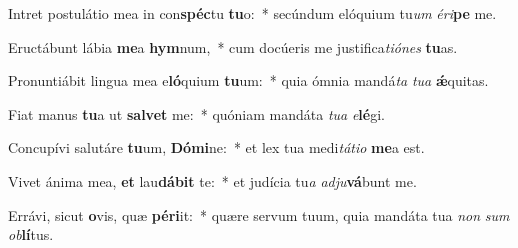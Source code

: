 \item Intret postulátio mea in con\textbf{spéc}tu \textbf{tu}o:~* secúndum elóquium tu\textit{um} \textit{é}\textit{ri}\textbf{pe} me.
\item Eructábunt lábia \textbf{me}a \textbf{hym}num,~* cum docúeris me justifica\textit{ti}\textit{ó}\textit{nes} \textbf{tu}as.
\item Pronuntiábit lingua mea e\textbf{ló}quium \textbf{tu}um:~* quia ómnia mandá\textit{ta} \textit{tu}\textit{a} \textbf{ǽ}quitas.
\item Fiat manus \textbf{tu}a ut \textbf{sal}\textbf{vet} me:~* quóniam mandáta \textit{tu}\textit{a} \textit{e}\textbf{lé}gi.
\item Concupívi salutáre \textbf{tu}um, \textbf{Dó}\textbf{mi}ne:~* et lex tua medi\textit{tá}\textit{ti}\textit{o} \textbf{me}a est.
\item Vivet ánima mea, \textbf{et} lau\textbf{dá}\textbf{bit} te:~* et judícia tu\textit{a} \textit{ad}\textit{ju}\textbf{vá}bunt me.
\item Errávi, sicut \textbf{o}vis, quæ \textbf{pér}\textbf{i}it:~* quære servum tuum, quia mandáta tua \textit{non} \textit{sum} \textit{ob}\textbf{lí}tus.

